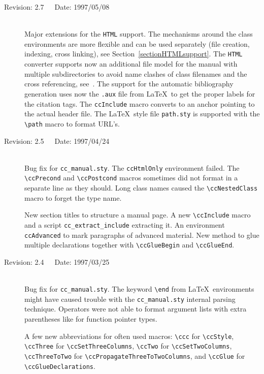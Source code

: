 \documentclass[11pt]{article}
\begin{document}
\begin{description}
    \item[Revision: 2.7~~~Date: 1997/05/08]~\\[3mm]
    Major extensions for the {\tt HTML} support. The mechanisms around the
    class environments are more flexible and can be used separately (file
    creation, indexing, cross linking), see
    Section~\ref{sectionHTMLsupport}. The {\tt HTML} converter supports
    now an additional file model for the manual with multiple
    subdirectories to avoid name clashes of class filenames and the cross
    referencing, see~\cite{k-lhcll-99}. The support for
    the automatic bibliography generation uses now the {\tt *.aux} file
    from \LaTeX\ to get the proper labels for the citation tags. The
    \verb+ccInclude+ macro converts to an anchor pointing to the actual
    header file. The \LaTeX\ style file {\tt path.sty} is supported
    with the \verb+\path+ macro to format URL's.


    \item[Revision: 2.5~~~Date: 1997/04/24]~\\[3mm]
    Bug fix for {\tt cc\_manual.sty}. The \verb+ccHtmlOnly+ environment
    failed. The \verb+\ccPrecond+ and \verb+\ccPostcond+ macros 
    sometimes did not format in a separate line as they should. Long class
    names caused the \verb+\ccNestedClass+ macro to forget the type name.

    New section titles to structure a manual page. A new \verb+\ccInclude+
    macro and a script \verb+cc_extract_include+ extracting it. An
    environment \verb+ccAdvanced+ to mark paragraphs of advanced material.
    New method to glue multiple declarations together with
    \verb+\ccGlueBegin+ and \verb+\ccGlueEnd+.


    \item[Revision: 2.4~~~Date: 1997/03/25]~\\[3mm]
    Bug fix for {\tt cc\_manual.sty}. The keyword \verb+\end+ from \LaTeX\ 
    environments might have caused trouble with the {\tt cc\_manual.sty}
    internal parsing technique. Operators were not able to format argument
    lists with extra parentheses like for function pointer types.

    A few new abbreviations for often used macros: \verb+\ccc+
    for \verb+\ccStyle+, \verb+\ccThree+ for \verb+\ccSetThreeColumns+,
    \verb+\ccTwo+ for \verb+\ccSetTwoColumns+, \verb+\ccThreeToTwo+ for
    \verb+\ccPropagateThreeToTwoColumns+, and \verb+\ccGlue+ for
    \verb+\ccGlueDeclarations+.



\end{description}
\end{document}
